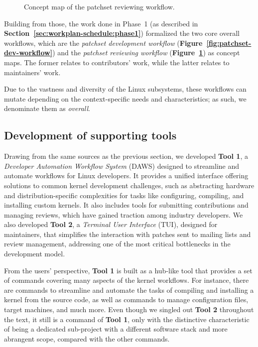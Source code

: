 \documentclass[sigconf]{acmart} %
\begin{document}
\begin{figure}[ht]
    \centering
    \caption{Concept map of the patchset reviewing workflow.}
    \label{fig:patchset-rev-workflow}
\end{figure}

Building from those, the work done in Phase~1 (as described in
\textbf{Section~\ref{sec:workplan-schedule:phase1}}) formalized the two core
overall workflows, which are the \textit{patchset development workflow}
(\textbf{Figure~\ref{fig:patchset-dev-workflow}}) and the \textit{patchset
reviewing workflow} (\textbf{Figure~\ref{fig:patchset-rev-workflow}}) as concept
maps. The former relates to contributors' work, while the latter relates to
maintainers' work.

Due to the vastness and diversity of the Linux subsystems, these workflows can
mutate depending on the context-specific needs and characteristics; as such, we
denominate them as \textit{overall}.

\subsection{Development of supporting tools}

Drawing from the same sources as the previous section, we developed
\textbf{Tool 1}, a \textit{Developer Automation Workflow System} (DAWS)
designed to streamline and automate workflows for Linux developers. It provides
a unified interface offering solutions to common kernel development challenges,
such as abstracting hardware and distribution-specific complexities for tasks
like configuring, compiling, and installing custom kernels. It also includes
tools for submitting contributions and managing reviews, which have gained
traction among industry developers. We also developed \textbf{Tool 2}, a
\textit{Terminal User Interface} (TUI), designed for maintainers, that
simplifies the interaction with patches sent to mailing lists and review
management, addressing one of the most critical bottlenecks in the development
model.

From the users' perspective, \textbf{Tool 1} is built as a hub-like tool that
provides a set of commands covering many aspects of the kernel workflows. For
instance, there are commands to streamline and automate the tasks of compiling
and installing a kernel from the source code, as well as commands to manage
configuration files, target machines, and much more. Even though we singled out
\textbf{Tool 2} throughout the text, it still is a command of \textbf{Tool 1},
only with the distinctive characteristic of being a dedicated sub-project with a
different software stack and more abrangent scope, compared with the other
commands.
\end{document}
